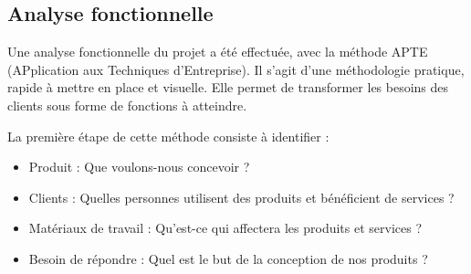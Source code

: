 \documentclass[pfe]{tnreport} %
\begin{document}
\subsection{Analyse fonctionnelle}

Une analyse fonctionnelle du projet a été effectuée, avec la méthode APTE (APplication aux Techniques d'Entreprise). \newline
Il s'agit d'une méthodologie pratique, rapide à mettre en place et visuelle. \newline
Elle permet de transformer les besoins des clients sous forme de fonctions à atteindre.

La première étape de cette méthode consiste à identifier : \newline
\begin{itemize}
 \item Produit : Que voulons-nous concevoir ?
 \item Clients : Quelles personnes utilisent des produits et bénéficient de services ?
 \item Matériaux de travail : Qu'est-ce qui affectera les produits et services ?
 \item Besoin de répondre : Quel est le but de la conception de nos produits ? \newline
\end{itemize}
\end{document}
